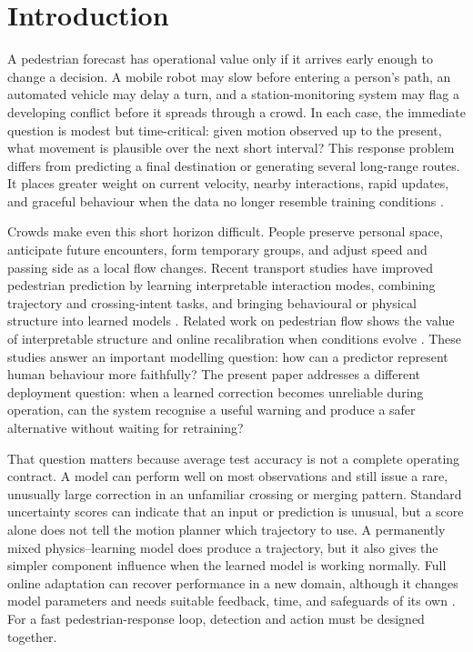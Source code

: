 \section{Introduction}
\label{sec:introduction_referee3}

A pedestrian forecast has operational value only if it arrives early enough to change a decision. A mobile robot may slow before entering a person's path, an automated vehicle may delay a turn, and a station-monitoring system may flag a developing conflict before it spreads through a crowd. In each case, the immediate question is modest but time-critical: given motion observed up to the present, what movement is plausible over the next short interval? This response problem differs from predicting a final destination or generating several long-range routes. It places greater weight on current velocity, nearby interactions, rapid updates, and graceful behaviour when the data no longer resemble training conditions \citep{rudenko2020survey,kothari2022}.

Crowds make even this short horizon difficult. People preserve personal space, anticipate future encounters, form temporary groups, and adjust speed and passing side as a local flow changes. Recent transport studies have improved pedestrian prediction by learning interpretable interaction modes, combining trajectory and crossing-intent tasks, and bringing behavioural or physical structure into learned models \citep{liu2024,munir2025,li2023cyclist}. Related work on pedestrian flow shows the value of interpretable structure and online recalibration when conditions evolve \citep{mai2025}. These studies answer an important modelling question: how can a predictor represent human behaviour more faithfully? The present paper addresses a different deployment question: when a learned correction becomes unreliable during operation, can the system recognise a useful warning and produce a safer alternative without waiting for retraining?

That question matters because average test accuracy is not a complete operating contract. A model can perform well on most observations and still issue a rare, unusually large correction in an unfamiliar crossing or merging pattern. Standard uncertainty scores can indicate that an input or prediction is unusual, but a score alone does not tell the motion planner which trajectory to use. A permanently mixed physics--learning model does produce a trajectory, but it also gives the simpler component influence when the learned model is working normally. Full online adaptation can recover performance in a new domain, although it changes model parameters and needs suitable feedback, time, and safeguards of its own \citep{ivanovic2023adaptive,park2024t4p}. For a fast pedestrian-response loop, detection and action must be designed together.

